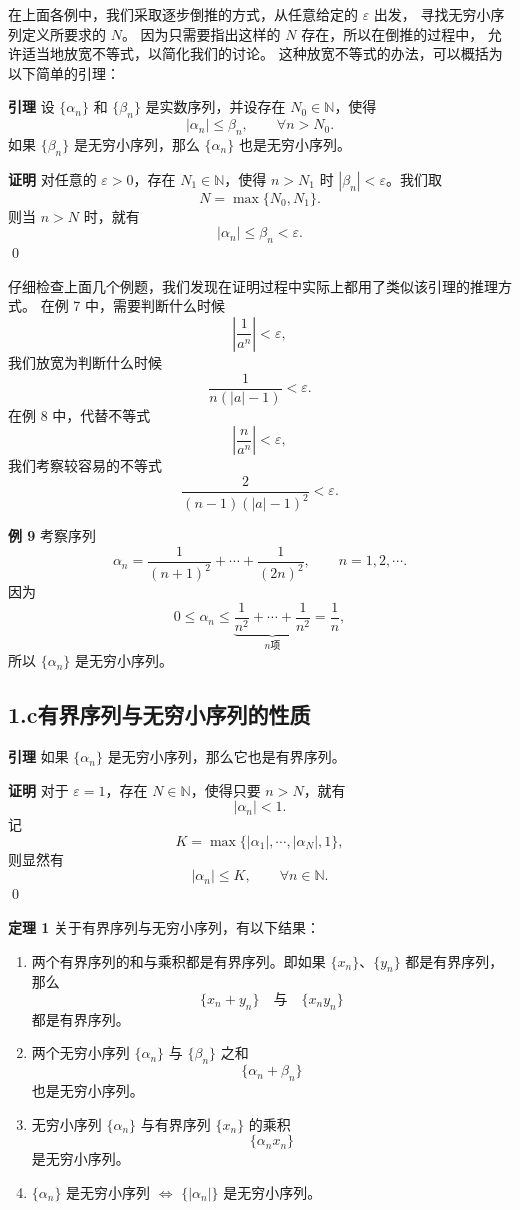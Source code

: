 \documentclass[12pt,a4paper,oneside]{ctexbook}
\begin{document}
在上面各例中，我们采取逐步倒推的方式，从任意给定的 $\varepsilon$ 出发，
寻找无穷小序列定义所要求的 $N$。
因为只需要指出这样的 $N$ 存在，所以在倒推的过程中，
允许适当地放宽不等式，以简化我们的讨论。
这种放宽不等式的办法，可以概括为以下简单的引理：

\medskip
\textbf{引理}\quad
设 $\{\alpha_n\}$ 和 $\{\beta_n\}$ 是实数序列，并设存在 $N_0\in\mathbb{N}$，使得
\[
    |\alpha_n|\le \beta_n,\qquad \forall n>N_0.
\]
如果 $\{\beta_n\}$ 是无穷小序列，那么 $\{\alpha_n\}$ 也是无穷小序列。

\textbf{证明}\quad
对任意的 $\varepsilon>0$，存在 $N_1\in\mathbb{N}$，使得 $n>N_1$ 时
$|\beta_n|<\varepsilon$。我们取
\[
    N=\max\{N_0,N_1\}.
\]
则当 $n>N$ 时，就有
\[
    |\alpha_n|\le \beta_n<\varepsilon.
\]
\qed

仔细检查上面几个例题，我们发现在证明过程中实际上都用了类似该引理的推理方式。
在例 7 中，需要判断什么时候
\[
    \left|\frac{1}{a^n}\right|<\varepsilon,
\]
我们放宽为判断什么时候
\[
    \frac{1}{n(|a|-1)}<\varepsilon.
\]
在例 8 中，代替不等式
\[
    \left|\frac{n}{a^n}\right|<\varepsilon,
\]
我们考察较容易的不等式
\[
    \frac{2}{(n-1)(|a|-1)^2}<\varepsilon.
\]

\medskip
\textbf{例 9}\quad
考察序列
\[
    \alpha_n=\frac{1}{(n+1)^2}+\cdots+\frac{1}{(2n)^2},
    \qquad n=1,2,\cdots.
\]
因为
\[
    0\le \alpha_n
    \le \underbrace{\frac1{n^2}+\cdots+\frac1{n^2}}_{n\text{项}}
    =\frac1n,
\]
所以 $\{\alpha_n\}$ 是无穷小序列。

\subsection*{1.c\quad 有界序列与无穷小序列的性质}

\textbf{引理}\quad
如果 $\{\alpha_n\}$ 是无穷小序列，那么它也是有界序列。

\textbf{证明}\quad
对于 $\varepsilon=1$，存在 $N\in\mathbb{N}$，使得只要 $n>N$，就有
\[
    |\alpha_n|<1.
\]
记
\[
    K=\max\{|\alpha_1|,\cdots,|\alpha_N|,1\},
\]
则显然有
\[
    |\alpha_n|\le K,\qquad \forall n\in\mathbb{N}.
\]
\qed

\medskip
\textbf{定理 1}\quad
关于有界序列与无穷小序列，有以下结果：
\begin{enumerate}[label=(\arabic*)]
  \item 两个有界序列的和与乘积都是有界序列。即如果 $\{x_n\}$、$\{y_n\}$ 都是有界序列，那么
  \[
      \{x_n+y_n\}\quad \text{与}\quad \{x_ny_n\}
  \]
  都是有界序列。

  \item 两个无穷小序列 $\{\alpha_n\}$ 与 $\{\beta_n\}$ 之和
  \[
      \{\alpha_n+\beta_n\}
  \]
  也是无穷小序列。

  \item 无穷小序列 $\{\alpha_n\}$ 与有界序列 $\{x_n\}$ 的乘积
  \[
      \{\alpha_nx_n\}
  \]
  是无穷小序列。

  \item $\{\alpha_n\}$ 是无穷小序列 $\Longleftrightarrow$
  $\{|\alpha_n|\}$ 是无穷小序列。
\end{enumerate}
\end{document}
